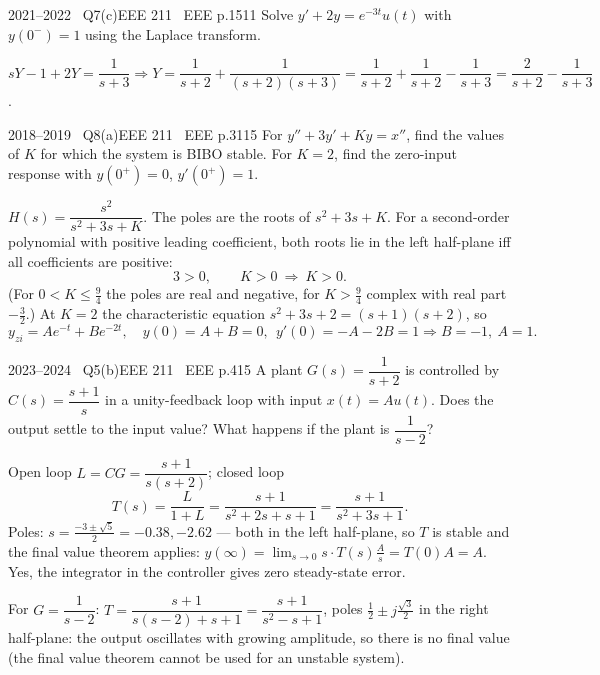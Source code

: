 \begin{qcard}{2021--2022 \textbullet\ Q7(c)}{EEE 211 \textbullet\ EEE p.15}{11}
Solve $y'+2y=e^{-3t}u(t)$ with $y(0^-)=1$ using the Laplace transform.
\end{qcard}
\begin{solution}
$sY-1+2Y=\dfrac1{s+3}\Rightarrow Y=\dfrac1{s+2}+\dfrac{1}{(s+2)(s+3)}=\dfrac1{s+2}+\dfrac1{s+2}-\dfrac1{s+3}=\dfrac2{s+2}-\dfrac1{s+3}$.
\end{solution}

\begin{qcard}{2018--2019 \textbullet\ Q8(a)}{EEE 211 \textbullet\ EEE p.31}{15}
For $y''+3y'+Ky=x''$, find the values of $K$ for which the system is BIBO stable. For $K=2$, find the zero-input response with $y(0^+)=0$, $y'(0^+)=1$.
\end{qcard}
\begin{solution}
$H(s)=\dfrac{s^2}{s^2+3s+K}$. The poles are the roots of $s^2+3s+K$. For a second-order polynomial with positive leading coefficient, both roots lie in the left half-plane iff all coefficients are positive:
\[3>0,\qquad K>0\ \Rightarrow\ K>0 .\]
(For $0<K\le\frac94$ the poles are real and negative, for $K>\frac94$ complex with real part $-\frac32$.) At $K=2$ the characteristic equation $s^2+3s+2=(s+1)(s+2)$, so
\[y_{zi}=Ae^{-t}+Be^{-2t},\quad y(0)=A+B=0,\ \ y'(0)=-A-2B=1\Rightarrow B=-1,\ A=1 .\]
\end{solution}

\begin{qcard}{2023--2024 \textbullet\ Q5(b)}{EEE 211 \textbullet\ EEE p.4}{15}
A plant $G(s)=\dfrac1{s+2}$ is controlled by $C(s)=\dfrac{s+1}{s}$ in a unity-feedback loop with input $x(t)=Au(t)$. Does the output settle to the input value? What happens if the plant is $\dfrac1{s-2}$?
\end{qcard}
\begin{solution}
Open loop $L=CG=\dfrac{s+1}{s(s+2)}$; closed loop
\[T(s)=\frac{L}{1+L}=\frac{s+1}{s^2+2s+s+1}=\frac{s+1}{s^2+3s+1}.\]
Poles: $s=\frac{-3\pm\sqrt5}2=-0.38,-2.62$ --- both in the left half-plane, so $T$ is stable and the final value theorem applies: $y(\infty)=\lim_{s\to0}s\cdot T(s)\frac As=T(0)A=A$. Yes, the integrator in the controller gives zero steady-state error.

For $G=\dfrac1{s-2}$: $T=\dfrac{s+1}{s(s-2)+s+1}=\dfrac{s+1}{s^2-s+1}$, poles $\frac12\pm j\frac{\sqrt3}2$ in the right half-plane: the output oscillates with growing amplitude, so there is no final value (the final value theorem cannot be used for an unstable system).
\end{solution}

